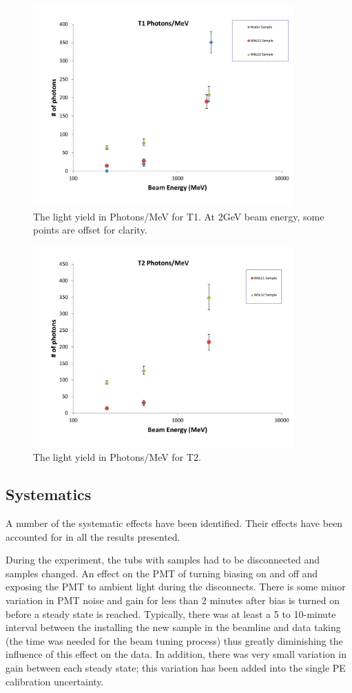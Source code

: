 \documentclass[preprint,12pt]{elsarticle}
\begin{document}
\begin{figure}[ht]
	\centering
		\includegraphics[width=100mm]{tub1signalInPhotonsperMEV.pdf}
	\caption{The light yield in Photons/MeV for T1. At 2GeV beam energy, some points are offset for clarity.}
	\label{fig:tub1signalInPhotonsperMEV}
\end{figure}

\begin{figure}[ht]
	\centering
		\includegraphics[width=100mm]{tub2signalInPhotonsperMEV.pdf}
	\caption{The light yield in Photons/MeV for T2.}
	\label{fig:tub2signalInPhotonsperMEV}
\end{figure}

\subsection{Systematics}
\label{systematicssection}

A number of the systematic effects have been identified. Their effects have been accounted for in all the results presented.

During the experiment, the tubs with samples had to be disconnected and samples changed. An effect on the PMT of turning biasing on and off and exposing the PMT to ambient light during the disconnects. There is some minor variation in PMT noise and gain for less than 2 minutes after bias is turned on before a steady state is reached. Typically, there was at least a 5 to 10-minute interval between the installing the new sample in the beamline and data taking (the time was needed for the beam tuning process) thus greatly diminishing the influence of this effect on the data. In addition, there was very small variation in gain between each steady state; this variation has been added into the single PE calibration uncertainty.
\end{document}
